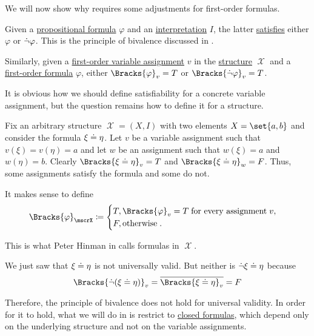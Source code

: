 \begin{remark}\label{rem:first_order_satisfiability_bivalence}
  We will now show why  requires some adjustments for first-order formulas.

  Given a \hyperref[def:propositional_grammar_schema/formula]{propositional formula} \( \varphi \) and an \hyperref[def:propositional_valuation/interpretation]{interpretation} \( I \), the latter \hyperref[def:propositional_model]{satisfies} either \( \varphi \) or \( \dot\neg \varphi \). This is the principle of bivalence discussed in .

  Similarly, given a \hyperref[def:first_order_valuation/variable_assignment]{first-order variable assignment} \( v \) in the \hyperref[def:first_order_structure]{structure} \( \mscrX \) and a \hyperref[def:first_order_syntax/formula]{first-order formula} \( \varphi \), either \( \Bracks{\varphi}_v = T \) or \( \Bracks{\synneg \varphi}_v = T \).

  It is obvious how we should define satisfiability for a concrete variable assignment, but the question remains how to define it for a structure.

  Fix an arbitrary structure \( \mscrX = (X, I) \) with two elements \( X = \set{ a, b } \) and consider the formula \( \xi \doteq \eta \). Let \( v \) be a variable assignment such that \( v(\xi) = v(\eta) = a \) and let \( w \) be an assignment such that \( w(\xi) = a \) and \( w(\eta) = b \). Clearly \( \Bracks{\xi \syneq \eta}_v = T \) and \( \Bracks{\xi \syneq \eta}_w = F \). Thus, some assignments satisfy the formula and some do not.

  It makes sense to define
  \begin{equation*}
    \Bracks{\varphi}_\mscrX
    \coloneqq
    \begin{cases}
      T, \Bracks{\varphi}_v = T \T{for every assignment} v, \\
      F, \T{otherwise}.
    \end{cases}
  \end{equation*}

  This is what Peter Hinman in  calls  formulas in \( \mscrX \).

  We just saw that \( \xi \doteq \eta \) is not universally valid. But neither is \( \dot\neg{\xi \doteq\eta} \) because
  \begin{equation*}
    \Bracks{\synneg (\xi \syneq \eta)}_v = \oline{\Bracks{\xi \syneq \eta}_v} = F
  \end{equation*}

  Therefore, the principle of bivalence does not hold for universal validity. In order for it to hold, what we will do in  is restrict to \hyperref[def:first_order_syntax/closed_formula]{closed formulas}, which depend only on the underlying structure and not on the variable assignments.
\end{remark}

